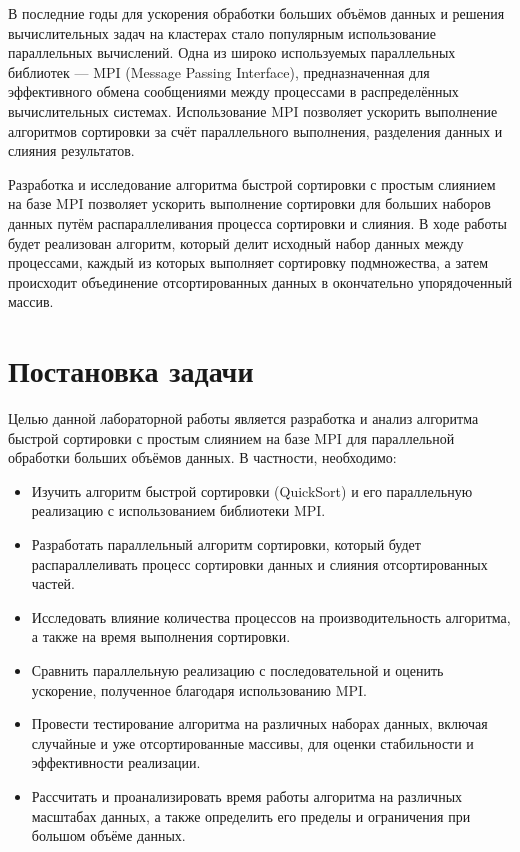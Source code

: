 \documentclass[12pt]{article}
\begin{document}
В последние годы для ускорения обработки больших объёмов данных и решения вычислительных задач на кластерах стало популярным использование параллельных вычислений. Одна из широко используемых параллельных библиотек — MPI (Message Passing Interface), предназначенная для эффективного обмена сообщениями между процессами в распределённых вычислительных системах. Использование MPI позволяет ускорить выполнение алгоритмов сортировки за счёт параллельного выполнения, разделения данных и слияния результатов.

Разработка и исследование алгоритма быстрой сортировки с простым слиянием на базе MPI позволяет  ускорить выполнение сортировки для больших наборов данных путём распараллеливания процесса сортировки и слияния. В ходе работы будет реализован алгоритм, который делит исходный набор данных между процессами, каждый из которых выполняет сортировку подмножества, а затем происходит объединение отсортированных данных в окончательно упорядоченный массив.

\newpage
\section{Постановка задачи}

\indent Целью данной лабораторной работы является разработка и анализ алгоритма быстрой сортировки с простым слиянием на базе MPI для параллельной обработки больших объёмов данных. В частности, необходимо:

\begin{itemize}
    \item Изучить алгоритм быстрой сортировки (QuickSort) и его параллельную реализацию с использованием библиотеки MPI.
    \item Разработать параллельный алгоритм сортировки, который будет распараллеливать процесс сортировки данных и слияния отсортированных частей.
    \item Исследовать влияние количества процессов на производительность алгоритма, а также на время выполнения сортировки.
    \item Сравнить параллельную реализацию с последовательной и оценить ускорение, полученное благодаря использованию MPI.
    \item Провести тестирование алгоритма на различных наборах данных, включая случайные и уже отсортированные массивы, для оценки стабильности и эффективности реализации.
    \item Рассчитать и проанализировать время работы алгоритма на различных масштабах данных, а также определить его пределы и ограничения при большом объёме данных.
\end{itemize}
\end{document}
